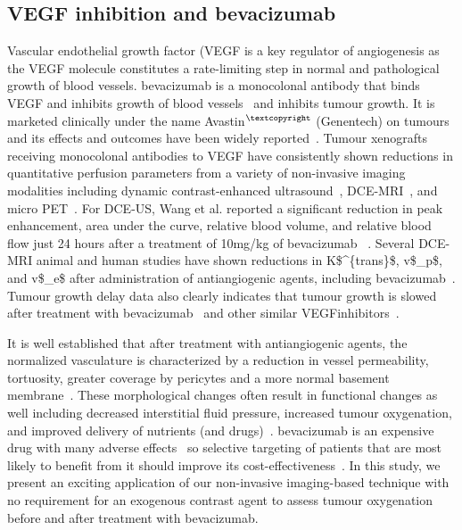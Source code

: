 \subsection{VEGF inhibition and bevacizumab}

Vascular endothelial growth factor (\acs{VEGF} is a key regulator of angiogenesis as the \acs{VEGF} molecule constitutes a rate-limiting step in normal and pathological growth of blood vessels.
bevacizumab is a monocolonal antibody that binds \acs{VEGF} and inhibits growth of blood vessels~\cite{Ferrara:2004fa} and inhibits tumour growth.
It is marketed clinically under the name Avastin$^{\tiny{\textcopyright}}$ (Genentech) on tumours and its effects and outcomes have been widely reported~\cite{Keating:2014gt, Pavlidis:2013bj, Barnett:2013bt, Kumler:2014gb}.
Tumour xenografts receiving monocolonal antibodies to VEGF have consistently shown reductions in quantitative perfusion parameters from a variety of non-invasive imaging modalities including dynamic contrast-enhanced ultrasound~\cite{Wang:2015bb}, \acs{DCE-MRI}~\cite{OConnor:2009cg}, and micro PET~\cite{Nagengast:2007hx}.
For \acs{DCE-US}, Wang et al. reported a significant reduction in peak enhancement, area under the curve, relative blood volume, and relative blood flow just 24 hours after a treatment of 10mg/kg of bevacizumab~\cite{Wang:2015bb} .  
Several DCE-MRI animal and human studies have shown reductions in \acs{K$^{trans}$}, \acs{v$_p$}, and \acs{v$_e$} after administration of antiangiogenic agents, including bevacizumab~\cite{Yang:2018hz}.
Tumour growth delay data also clearly indicates that tumour growth is slowed after treatment with bevacizumab~\cite{Yang:2018hz} and other similar \acs{VEGF}inhibitors~\cite{OConnor:2012ie}.

It is well established that after treatment with antiangiogenic agents, the normalized vasculature is characterized by a reduction in vessel permeability, tortuosity, greater coverage by pericytes and a more normal basement membrane~\cite{Jain:2005gk}. 
These morphological changes often result in functional changes as well including decreased interstitial fluid pressure, increased tumour oxygenation, and improved delivery of nutrients (and drugs)~\cite{Jain:2005gk}.
bevacizumab is an expensive drug with many adverse effects~\cite{Keating:2014gt} so selective targeting of patients that are most likely to benefit from it should improve its cost-effectiveness~\cite{Barnett:2013bt}.
In this study, we present an exciting application of our non-invasive imaging-based technique with no requirement for an exogenous contrast agent to assess tumour oxygenation before and after treatment with bevacizumab.

